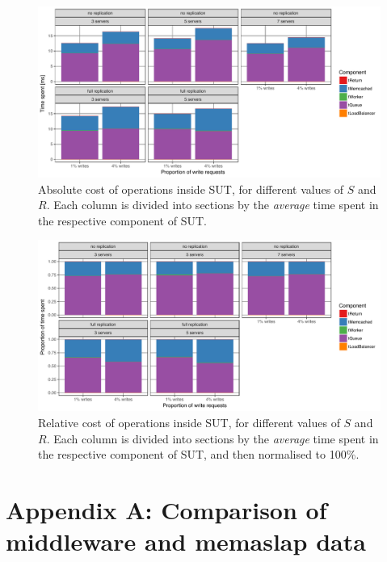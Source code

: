 \documentclass[11pt]{article}
\begin{document}
\begin{figure}[h]
\centering
\includegraphics[width=\textwidth]{../results/writes/graphs/time_breakdown_vs_writes_set_abs.pdf}
\caption{Absolute cost of operations inside SUT, for different values of $S$ and $R$. Each column is divided into sections by the \emph{average} time spent in the respective component of SUT.}
\label{fig:exp3:res:breakdown:set:abs}
\end{figure}

\begin{figure}[h]
\centering
\includegraphics[width=\textwidth]{../results/writes/graphs/time_breakdown_vs_writes_set_rel.pdf}
\caption{Relative cost of operations inside SUT, for different values of $S$ and $R$. Each column is divided into sections by the \emph{average} time spent in the respective component of SUT, and then normalised to 100\%.}
\label{fig:exp3:res:breakdown:set:rel}
\end{figure}


\clearpage

\section*{Appendix A: Comparison of middleware and memaslap data}
\label{sec:appa}
\end{document}
